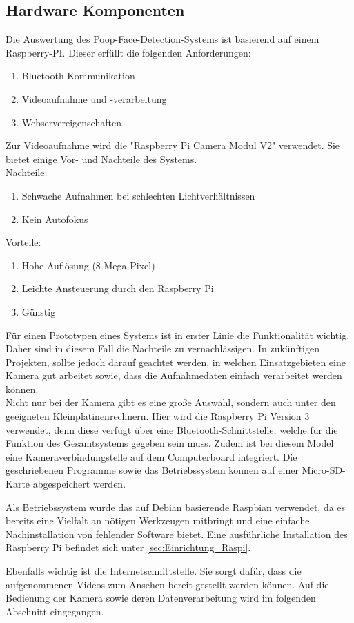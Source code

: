 \subsection{Hardware Komponenten}
\label{subsec:evalsys_hardware}

Die Auswertung des Poop-Face-Detection-Systems ist basierend auf einem Raspberry-PI. Dieser erfüllt die folgenden Anforderungen:

\begin{enumerate}
\item Bluetooth-Kommunikation
\item Videoaufnahme und -verarbeitung
\item Webservereigenschaften
\end{enumerate}

Zur Videoaufnahme wird die "Raspberry Pi Camera Modul V2" verwendet. Sie bietet einige Vor- und Nachteile des Systems. \\

Nachteile:
\begin{enumerate}
\item Schwache Aufnahmen bei schlechten Lichtverhältnissen
\item Kein Autofokus
\end{enumerate}
\vspace{0.35cm}

Vorteile:
\begin{enumerate}
\item Hohe Auflösung (8 Mega-Pixel)
\item Leichte Ansteuerung durch den Raspberry Pi
\item Günstig
\end{enumerate}

Für einen Prototypen eines Systems ist in erster Linie die Funktionalität wichtig. Daher sind in diesem Fall die Nachteile zu vernachlässigen. In zukünftigen Projekten, sollte jedoch darauf geachtet werden, in welchen Einsatzgebieten eine Kamera gut arbeitet sowie, dass die Aufnahmedaten einfach verarbeitet werden können.\cite{picam_website} \\

Nicht nur bei der Kamera gibt es eine große Auswahl, sondern auch unter den geeigneten Kleinplatinenrechnern. Hier wird die Raspberry Pi Version 3 verwendet, denn diese verfügt über eine Bluetooth-Schnittstelle, welche für die Funktion des Gesamtsystems gegeben sein muss. Zudem ist bei diesem Model eine Kameraverbindungstelle auf dem Computerboard integriert. Die geschriebenen Programme sowie das Betriebssystem können auf einer Micro-SD-Karte abgespeichert werden.\cite{raspi_datenblatt}

Als Betriebssystem wurde das auf Debian basierende Raspbian verwendet, da es bereits eine Vielfalt an nötigen Werkzeugen mitbringt und eine einfache Nachinstallation von fehlender Software bietet. Eine ausführliche Installation des Raspberry Pi befindet sich unter \ref{sec:Einrichtung_Raspi}.

Ebenfalls wichtig ist die Internetschnittstelle. Sie sorgt dafür, dass die aufgenommenen Videos zum Ansehen bereit gestellt werden können. Auf die Bedienung der Kamera sowie deren Datenverarbeitung wird im folgenden Abschnitt eingegangen.
